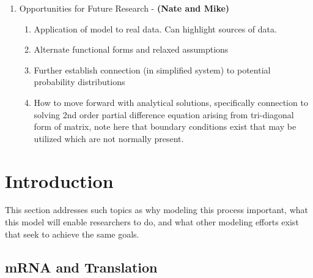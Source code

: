 \documentclass[review]{elsarticle}
\begin{document}
\begin{enumerate}
\begin{enumerate}
\end{enumerate}
\item Opportunities for Future Research  - \textbf{(Nate and Mike)}
\begin{enumerate}
\item Application of model to real data.
Can highlight sources of data.
\item Alternate functional forms and relaxed assumptions
\item Further establish connection (in simplified system) to potential probability distributions
\item How to move forward with analytical solutions, specifically connection to solving 2nd order partial difference equation arising from tri-diagonal form of matrix, note here that boundary conditions exist that may be utilized which are not normally present.
\end{enumerate}
\end{enumerate}
\newpage
\section{Introduction}
This section addresses such topics as why modeling this process important, what this model will enable researchers to do, and what other modeling efforts exist that seek to achieve the same goals.

\subsection{mRNA and Translation}\label{sec:Bioligical underpinnings}
\end{document}
